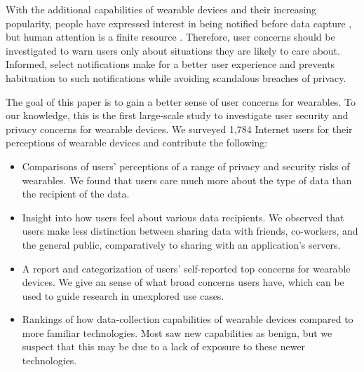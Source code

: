 With the additional capabilities of wearable devices and their increasing popularity, people have expressed interest in being notified before data capture \cite{denning2014situ}, but human attention is a finite resource \cite{bohme2011security}. Therefore, user concerns should be investigated to warn users only about situations they are likely to care about. Informed, select notifications make for a better user experience and prevents habituation to such notifications while avoiding scandalous breaches of privacy.

The goal of this paper is to gain a better sense of user concerns for wearables. To our knowledge, this is the first large-scale study to investigate user security and privacy concerns for wearable devices. We surveyed 1,784 Internet users for their perceptions of wearable devices and contribute the following: \\[-0.8cm]

\begin{itemize} \itemsep1pt \parskip0pt 
\item Comparisons of users' perceptions of a range of privacy and security risks of wearables. We found that users care much more about the type of data than the recipient of the data.
\item Insight into how users feel about various data recipients. We observed that users make less distinction between sharing data with friends, co-workers, and the general public, comparatively to sharing with an application's servers.
\item A report and categorization of users' self-reported top concerns for wearable devices. We give an sense of what broad concerns users have, which can be used to guide research in unexplored use cases. 
\item Rankings of how data-collection capabilities of wearable devices compared to more familiar technologies.  Most saw new capabilities as benign, but we suspect that this may be due to a lack of exposure to these newer technologies.
\end{itemize}